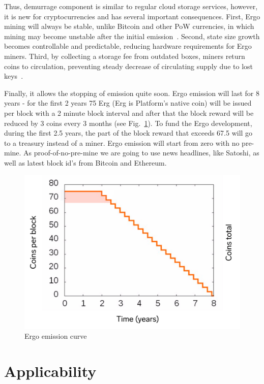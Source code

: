 \documentclass[]{article}
\begin{document}
    Thus, demurrage component is similar to regular cloud storage services, however, it is new for
    cryptocurrencies and has several important consequences. First, Ergo mining will always be
    stable, unlike Bitcoin and other PoW currencies, in which mining may become unstable after the
    initial emission~\cite{carlsten2016instability}. Second, state size growth becomes controllable and predictable,
    reducing hardware requirements for Ergo miners. Third, by collecting a storage fee from outdated boxes,
    miners return coins to circulation, preventing steady decrease of circulating supply due to lost
    keys~\cite{wsj2018}.

    Finally, it allows the stopping of emission quite soon. Ergo emission will last for 8 years - for the
    first 2 years 75 Erg (Erg is Platform's native coin) will be issued per block with a 2 minute block
    interval and after that the block reward will be reduced by 3 coins every 3 months (see Fig.~\ref{fig:emission}).
    To fund the Ergo development, during the first 2.5 years, the part of the block reward that
    exceeds 67.5 will go to a treasury instead of a miner. Ergo emission will start from zero with no
    pre-mine. As proof-of-no-pre-mine we are going to use news headlines, like Satoshi, as well as
    latest block id's from Bitcoin and Ethereum.

    \begin{figure}[ht]
        \centering
        \includegraphics[width=\textwidth]{emission.jpg}
        \caption{Ergo emission curve
        \label{fig:emission} }
    \end{figure}


    \section{Applicability}
\end{document}
